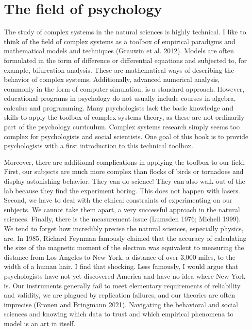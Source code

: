 \documentclass[
  a4paper,
  DIV=11,
  numbers=noendperiod,
  oneside]{scrreprt}
\begin{document}
\hypertarget{sec-The-field-of-psychology}{%
\section{The field of psychology}\label{sec-The-field-of-psychology}}

The study of complex systems in the natural sciences is highly
technical. I like to think of the field of complex systems as a toolbox
of empirical paradigms and mathematical models and techniques (Grauwin
et al. 2012). Models are often formulated in the form of difference or
differential equations and subjected to, for example, bifurcation
analysis. These are mathematical ways of describing the behavior of
complex systems. Additionally, advanced numerical analysis, commonly in
the form of computer simulation, is a standard approach. However,
educational programs in psychology do not usually include courses in
algebra, calculus and programming. Many psychologists lack the basic
knowledge and skills to apply the toolbox of complex systems theory, as
these are not ordinarily part of the psychology curriculum. Complex
systems research simply seems too complex for psychologists and social
scientists. One goal of this book is to provide psychologists with a
first introduction to this technical toolbox.

Moreover, there are additional complications in applying the toolbox to
our field. First, our subjects are much more complex than flocks of
birds or tornadoes and display astonishing behavior. They can do
science! They can also walk out of the lab because they find the
experiment boring. This does not happen with lasers. Second, we have to
deal with the ethical constraints of experimenting on our subjects. We
cannot take them apart, a very successful approach in the natural
sciences. Finally, there is the measurement issue (Lumsden 1976; Michell
1999). We tend to forget how incredibly precise the natural sciences,
especially physics, are. In 1985, Richard Feynman famously claimed that
the accuracy of calculating the size of the magnetic moment of the
electron was equivalent to measuring the distance from Los Angeles to
New York, a distance of over 3,000 miles, to the width of a human hair.
I find that shocking. Less famously, I would argue that psychologists
have not yet discovered America and have no idea where New York is. Our
instruments generally fail to meet elementary requirements of
reliability and validity, we are plagued by replication failures, and
our theories are often imprecise (Eronen and Bringmann 2021). Navigating
the behavioral and social sciences and knowing which data to trust and
which empirical phenomena to model is an art in itself.
\end{document}
